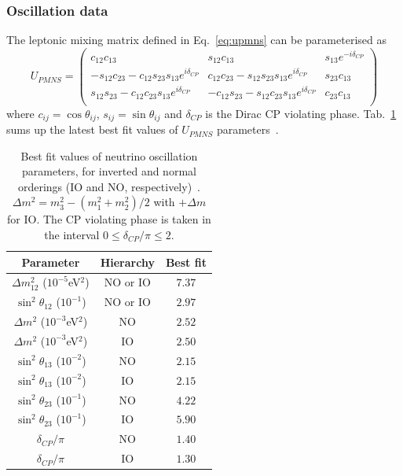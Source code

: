 \subsubsection*{Oscillation data}

The leptonic mixing matrix defined in Eq.~\eqref{eq:upmns} can be parameterised as
\begin{equation}
  U_{PMNS}=
  \begin{pmatrix}
    c_{12}c_{13} & s_{12}c_{13} & s_{13}e^{-i\delta_{CP}} \\
    -s_{12}c_{23}-c_{12}s_{23}s_{13}e^{i\delta_{CP}} & c_{12}c_{23}-s_{12}s_{23}s_{13}e^{i\delta_{CP}} & s_{23}c_{13} \\
    s_{12}s_{23}-c_{12}c_{23}s_{13}e^{i\delta_{CP}} &  -c_{12}s_{23}-s_{12}c_{23}s_{13}e^{i\delta_{CP}} &  c_{23}c_{13} \\
  \end{pmatrix}
  \label{eq:upmns_detail}
\end{equation}
where $c_{ij}=\cos{\theta_{ij}}$, $s_{ij}=\sin{\theta_{ij}}$ and $\delta_{CP}$ is the Dirac CP violating phase.
Tab.~\ref{tab:best_fit} sums up the latest best fit values of $U_{PMNS}$ parameters~\cite{art:Capozzi_2017}.
\begin{table}[h]
  \centering
  \begin{tabular}{|c|c|c|}
    \hline
    Parameter & Hierarchy & Best fit \\
    \hline\hline
    $\Delta m^{2}_{12}$ ($10^{-5}$eV$^{2}$) & NO or IO & $7.37$ \\
    \hline
    $\sin^{2}\theta_{12}$ ($10^{-1}$) & NO or IO & $2.97$ \\
    \hline
    $\Delta m^2$ ($10^{-3}$eV$^{2}$) & NO & $2.52$ \\
    $\Delta m^2$ ($10^{-3}$eV$^{2}$) & IO & $2.50$ \\
    \hline
    $\sin^{2}\theta_{13}$ ($10^{-2}$) & NO & $2.15$ \\
    $\sin^{2}\theta_{13}$ ($10^{-2}$) & IO & $2.15$ \\
    \hline
    $\sin^{2}\theta_{23}$ ($10^{-1}$) & NO & $4.22$ \\
    $\sin^{2}\theta_{23}$ ($10^{-1}$) & IO & $5.90$ \\
    \hline
    $\delta_{CP}/\pi$ & NO & $1.40$ \\
    $\delta_{CP}/\pi$ & IO & $1.30$ \\
    \hline
  \end{tabular}
  \caption{Best fit values of neutrino oscillation parameters, for inverted and normal orderings (IO and NO, respectively)~\cite{art:Capozzi_2017}.
    ${\Delta m^{2}=m_3^2-(m_1^2+m_2^2)/2}$ with $+\Delta m$ for IO.
    The CP violating phase is taken in the interval $0\leq\delta_{CP}/\pi\leq2$.
    \label{tab:best_fit}}
\end{table}

